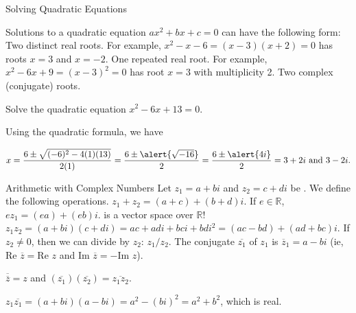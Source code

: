 \documentclass[xcolor=dvipsnames,aspectratio=169,t]{beamer}
\renewcommand{\Re}{\ensuremath{\text{Re }}}
\renewcommand{\Im}{\ensuremath{\text{Im }}}
\begin{document}
\begin{frame}{Solving Quadratic Equations}
  \smallskip

  Solutions to a quadratic equation $ax^2+bx+c=0$ can have the following form:
  \bi
  \ii \alert{Two distinct real roots.} For example, $x^2-x-6=(x-3)(x+2)=0$ has roots $x=3$ and $x=-2$.
  \ii \alert{One repeated real root.} For example, $x^2-6x+9=(x-3)^2=0$ has root $x=3$ with multiplicity 2.
  \ii \alert{Two complex (conjugate) roots.}
  \ei
  \smallskip

  \pause
  \begin{example}
  Solve the quadratic equation $x^2-6x+13=0$.
  \end{example}

  Using the quadratic formula, we have

  \[ x = \frac{6 \pm \sqrt{(-6)^2-4(1)(13)}}{2(1)} = \frac{6 \pm \alert{\sqrt{-16}}}{2} = \frac{6 \pm \alert{4i}}{2} = 3 + 2i \mbox{ and } 3-2i.\]

\end{frame}


\begin{frame}{Arithmetic with Complex Numbers}
  \bbox
  Let $z_1 = a + b i$ and $z_2 = c+d i$ be . We define the following operations.
  \vspace*{-1em}
  \bi
  \ii $z_1 + z_2 = (a+c) + (b+d)i$. \ms
  \ii If $e\in \mathbb{R}$, $e z_1 = (ea) + (eb)i$. \quad
  \pause {} is a \alert{vector space} over $\mathbb{R}$! \ms
  \pause
  \ii $z_1z_2 = (a+bi)(c+di) = ac + adi + bci + bdi^2 = (ac -bd) + (ad+bc)i$. \ms
  \ii If $z_2\ne 0$, then we can divide by $z_2$: $z_1/z_2$. \ms
  \pause
  \ii The \alert{conjugate} $\overline{z_1}$ of $z_1$ is $\overline{z}_1 = a-bi$
      (ie, $\Re \overline{z} = \Re z$ and $\Im \overline{z} = - \Im z$). \ms
  \bi
  \item $\overline{\overline{z}} = z$ and $(\overline{z_1}) (\overline{z_2}) = \overline{z_1z_2}$. \medskip
  \item $z_1 \overline{z_1} = (a+bi)(a-bi) = a^2 - (bi)^2 = a^2 + b^2$, which is real. \medskip
  \ei
  \ei
  \ebox
\end{frame}
\end{document}
